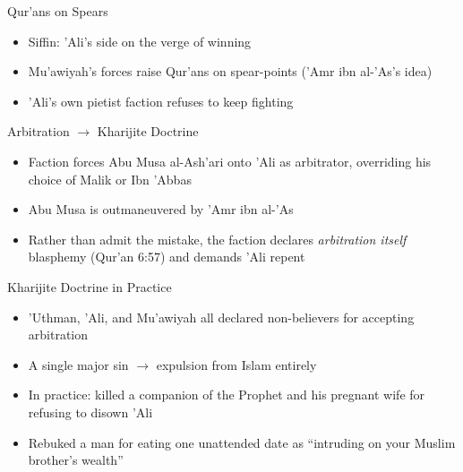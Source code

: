 \begin{frame}{Qur'ans on Spears}
\begin{itemize}[itemsep=5pt]
  \item Siffin: 'Ali's side on the verge of winning
  \item Mu'awiyah's forces raise Qur'ans on spear-points ('Amr ibn al-'As's idea)
  \item 'Ali's own pietist faction refuses to keep fighting
\end{itemize}
\end{frame}

\begin{frame}{Arbitration $\rightarrow$ Kharijite Doctrine}
\begin{itemize}[itemsep=5pt]
  \item Faction forces Abu Musa al-Ash'ari onto 'Ali as arbitrator, overriding his choice of Malik or Ibn 'Abbas
  \item Abu Musa is outmaneuvered by 'Amr ibn al-'As
  \item Rather than admit the mistake, the faction declares \emph{arbitration itself} blasphemy (Qur'an 6:57) and demands 'Ali repent
\end{itemize}
\end{frame}

\begin{frame}{Kharijite Doctrine in Practice}
\begin{itemize}[itemsep=5pt]
  \item 'Uthman, 'Ali, and Mu'awiyah all declared non-believers for accepting arbitration
  \item A single major sin $\rightarrow$ expulsion from Islam entirely
  \item In practice: killed a companion of the Prophet and his pregnant wife for refusing to disown 'Ali
  \item Rebuked a man for eating one unattended date as ``intruding on your Muslim brother's wealth''
\end{itemize}
\end{frame}

